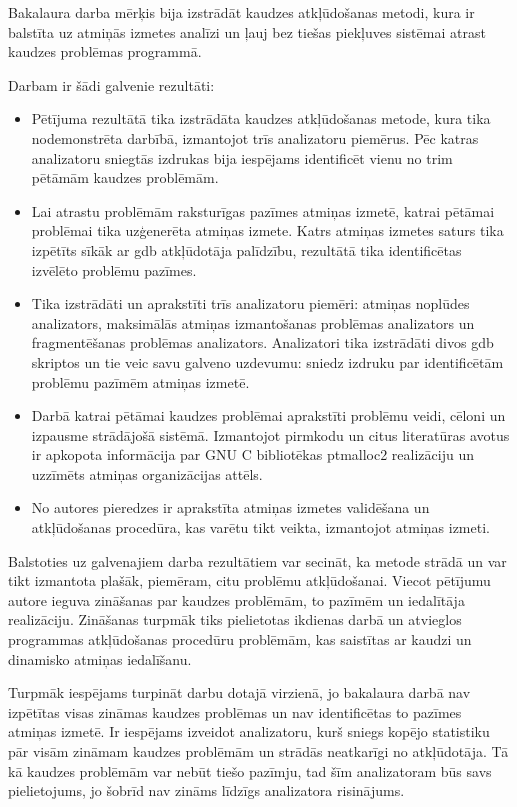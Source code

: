﻿Bakalaura darba mērķis bija izstrādāt kaudzes atkļūdošanas metodi, kura ir balstīta uz atmiņās izmetes analīzi un ļauj bez tiešas piekļuves sistēmai atrast kaudzes problēmas programmā.

Darbam ir šādi galvenie rezultāti:
\begin{itemize}
    \item Pētījuma rezultātā tika izstrādāta kaudzes atkļūdošanas metode, kura tika nodemonstrēta darbībā, izmantojot trīs analizatoru piemērus.
    Pēc katras analizatoru sniegtās izdrukas bija iespējams identificēt vienu no trim pētāmām kaudzes problēmām.
    \item Lai atrastu problēmām raksturīgas pazīmes atmiņas izmetē, katrai pētāmai problēmai tika uzģenerēta atmiņas izmete.
    Katrs atmiņas izmetes saturs tika izpētīts sīkāk ar gdb atkļūdotāja palīdzību, rezultātā tika identificētas izvēlēto problēmu pazīmes.
    \item Tika izstrādāti un aprakstīti trīs analizatoru piemēri: atmiņas noplūdes analizators, maksimālās atmiņas izmantošanas problēmas analizators un fragmentēšanas problēmas analizators.
    Analizatori tika izstrādāti divos gdb skriptos un tie veic savu galveno uzdevumu: sniedz izdruku par identificētām problēmu pazīmēm atmiņas izmetē. 
    \item Darbā katrai pētāmai kaudzes problēmai aprakstīti problēmu veidi, cēloni un izpausme strādājošā sistēmā. 
    Izmantojot pirmkodu un citus literatūras avotus ir apkopota informācija par GNU C bibliotēkas ptmalloc2 realizāciju un uzzīmēts atmiņas organizācijas attēls. 
    \item No autores pieredzes ir aprakstīta atmiņas izmetes validēšana un atkļūdošanas procedūra, kas varētu tikt veikta, izmantojot atmiņas izmeti.
\end{itemize}

Balstoties uz galvenajiem darba rezultātiem var secināt, ka metode strādā un var tikt izmantota plašāk, piemēram, citu problēmu atkļūdošanai.
Viecot pētījumu autore ieguva zināšanas par kaudzes problēmām, to pazīmēm un iedalītāja realizāciju.
Zināšanas turpmāk tiks pielietotas ikdienas darbā un atvieglos programmas atkļūdošanas procedūru problēmām, kas saistītas ar kaudzi un dinamisko atmiņas iedalīšanu. 

Turpmāk iespējams turpināt darbu dotajā virzienā, jo bakalaura darbā nav izpētītas visas zināmas kaudzes problēmas un nav identificētas to pazīmes atmiņas izmetē.
Ir iespējams izveidot analizatoru, kurš sniegs kopējo statistiku pār visām zināmam kaudzes problēmām un strādās neatkarīgi no atkļūdotāja. 
Tā kā kaudzes problēmām var nebūt tiešo pazīmju, tad šīm analizatoram būs savs pielietojums, jo šobrīd nav zināms līdzīgs analizatora risinājums.
